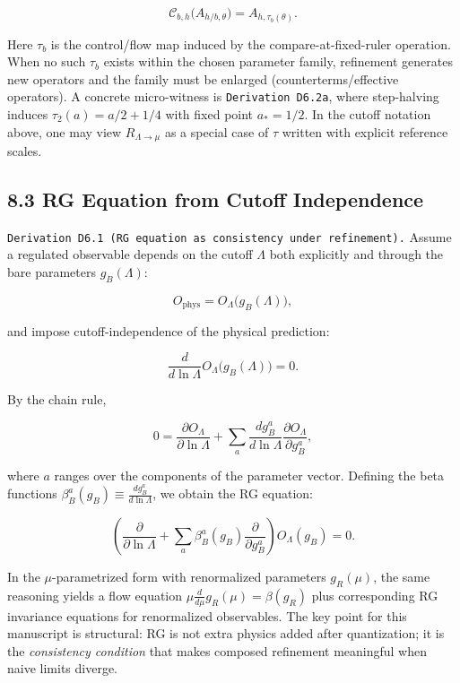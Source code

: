 \documentclass[
]{article}
\begin{document}
\[
\mathcal C_{b,h}\!\big(A_{h/b,\theta}\big)=A_{h,\tau_b(\theta)}.
\]

Here \(\tau_b\) is the control/flow map induced by the
compare-at-fixed-ruler operation. When no such \(\tau_b\) exists within
the chosen parameter family, refinement generates new operators and the
family must be enlarged (counterterms/effective operators). A concrete
micro-witness is \texttt{Derivation\ D6.2a}, where step-halving induces
\(\tau_2(a)=a/2+1/4\) with fixed point \(a_\ast=1/2\). In the cutoff
notation above, one may view \(R_{\Lambda\to\mu}\) as a special case of
\(\tau\) written with explicit reference scales.

\subsection{8.3 RG Equation from Cutoff
Independence}\label{rg-equation-from-cutoff-independence}

\texttt{Derivation\ D6.1\ (RG\ equation\ as\ consistency\ under\ refinement).}
Assume a regulated observable depends on the cutoff \(\Lambda\) both
explicitly and through the bare parameters \(g_B(\Lambda)\):

\[
O_{\mathrm{phys}} = O_\Lambda\big(g_B(\Lambda)\big),
\]

and impose cutoff-independence of the physical prediction:

\[
\frac{d}{d\ln\Lambda} O_\Lambda\big(g_B(\Lambda)\big)=0.
\]

By the chain rule,

\[
0
=
\frac{\partial O_\Lambda}{\partial \ln\Lambda}
+
\sum_a \frac{d g_B^a}{d\ln\Lambda}\frac{\partial O_\Lambda}{\partial g_B^a}
,
\]

where \(a\) ranges over the components of the parameter vector. Defining
the beta functions \(\beta_B^a(g_B)\equiv \frac{d g_B^a}{d\ln\Lambda}\),
we obtain the RG equation:

\[
\left(\frac{\partial}{\partial \ln\Lambda}
+\sum_a \beta_B^a(g_B)\frac{\partial}{\partial g_B^a}\right)O_\Lambda(g_B)=0.
\]

In the \(\mu\)-parametrized form with renormalized parameters
\(g_R(\mu)\), the same reasoning yields a flow equation
\(\mu \frac{d}{d\mu}g_R(\mu)=\beta(g_R)\) plus corresponding RG
invariance equations for renormalized observables. The key point for
this manuscript is structural: RG is not extra physics added after
quantization; it is the \emph{consistency condition} that makes composed
refinement meaningful when naive limits diverge.
\end{document}
